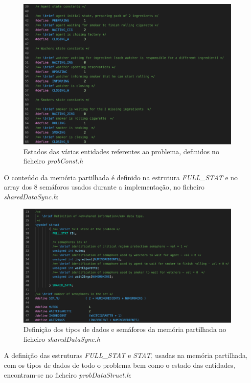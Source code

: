 \documentclass[10pt,portuguese]{article}
\begin{document}
\begin{figure}[!h]
    \centering
    \includegraphics[width=\textwidth]{images/Problem/estados.png}
    \caption{Estados das várias entidades referentes ao problema, definidos no ficheiro \textit{probConst.h}}
\end{figure}
\clearpage
\par O conteúdo da memória partilhada é definido na estrutura \textit{FULL\_STAT} e no array dos 8 semáforos usados durante a implementação, no ficheiro \textit{sharedDataSync.h}:
\begin{figure}[!h]
    \centering
    \includegraphics[width=\textwidth]{images/Problem/sharedmem.png}
    \caption{Definição dos tipos de dados e semáforos da memória partilhada no ficheiro \textit{sharedDataSync.h}}
\end{figure}
\clearpage
\par A definição das estruturas \textit{FULL\_STAT} e \textit{STAT}, usadas na memória partilhada, com os tipos de dados de todo o problema bem como o estado das entidades, encontram-se no ficheiro \textit{probDataStruct.h}:
\end{document}
